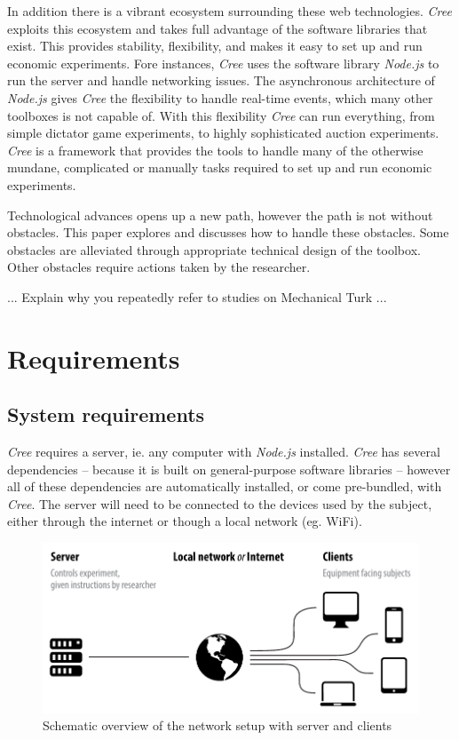 \documentclass[preprint, 12pt]{elsarticle}
\newcommand{\Cree}{\emph{Cree}\xspace}
\begin{document}
In addition there is a vibrant ecosystem surrounding these web technologies. \Cree exploits this ecosystem and takes full advantage of the software libraries that exist. This provides stability, flexibility, and makes it easy to set up and run economic experiments. Fore instances, \Cree uses the software library \emph{Node.js} to run the server and handle networking issues. The asynchronous architecture of \emph{Node.js} gives \Cree the flexibility to handle real-time events, which many other toolboxes is not capable of. With this flexibility \Cree can run everything, from simple dictator game experiments, to highly sophisticated auction experiments. \Cree is a framework that provides the tools to handle many of the otherwise mundane, complicated or manually tasks required to set up and run economic experiments.

Technological advances opens up a new path, however the path is not without obstacles. This paper explores and discusses how to handle these obstacles. Some obstacles are alleviated through appropriate technical design of the toolbox. Other obstacles require actions taken by the researcher.

{\color{red}... Explain why you repeatedly refer to studies on Mechanical Turk ...}

\section{Requirements}
\label{S:Requirements}

\subsection{System requirements}

\Cree requires a server, ie. any computer with \emph{Node.js} installed. \Cree has several dependencies -- because it is built on general-purpose software libraries -- however all of these dependencies are automatically installed, or come pre-bundled, with \Cree. The server will need to be connected to the devices used by the subject, either through the internet or though a local network (eg. WiFi). 

\begin{figure}[h!]
  \caption{Schematic overview of the network setup with server and clients}
  \centering
    \includegraphics[width=\textwidth]{figures/setup}
\end{figure}
\end{document}
